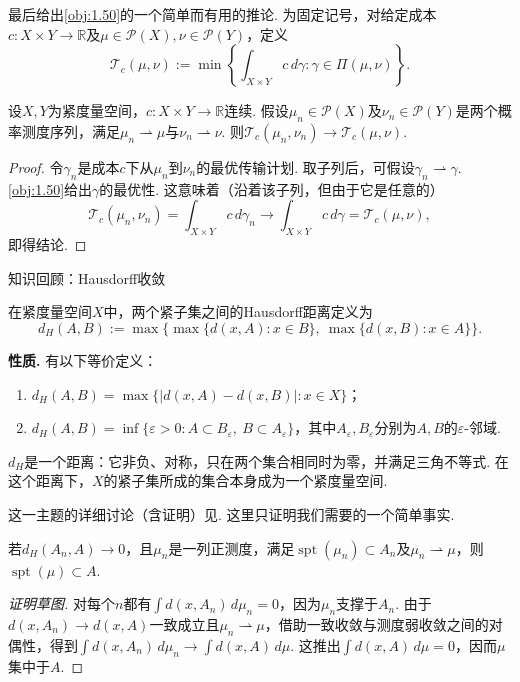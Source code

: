 最后给出\autoref{obj:1.50}的一个简单而有用的推论. 为固定记号，对给定成本$c:X\times Y\to\mathbb R$及$\mu\in\mathscr P(X),\nu\in\mathscr P(Y)$，定义
\[
\mathscr T_c(\mu,\nu):=\min\left\{\int_{X\times Y}c\,d\gamma:\gamma\in\Pi(\mu,\nu)\right\}.
\]

\begin{theorem}\label{obj:1.51}
设$X,Y$为紧度量空间，$c:X\times Y\to\mathbb R$连续. 假设$\mu_n\in\mathscr P(X)$及$\nu_n\in\mathscr P(Y)$是两个概率测度序列，满足$\mu_n\rightharpoonup\mu$与$\nu_n\rightharpoonup\nu$. 则$\mathscr T_c(\mu_n,\nu_n)\to\mathscr T_c(\mu,\nu)$.
\end{theorem}
\begin{proof}
令$\gamma_n$是成本$c$下从$\mu_n$到$\nu_n$的最优传输计划. 取子列后，可假设$\gamma_n\rightharpoonup\gamma$. \autoref{obj:1.50}给出$\gamma$的最优性. 这意味着（沿着该子列，但由于它是任意的）
\[
\mathscr T_c(\mu_n,\nu_n)=\int_{X\times Y}c\,d\gamma_n
\longrightarrow\int_{X\times Y}c\,d\gamma=\mathscr T_c(\mu,\nu),
\]
即得结论.
\end{proof}

\begin{sourcebox}{知识回顾：Hausdorff收敛}\label{box:1.13}
\begin{definition*}
在紧度量空间$X$中，两个紧子集之间的Hausdorff距离定义为
\[
d_H(A,B):=\max\{\max\{d(x,A):x\in B\},\ \max\{d(x,B):x\in A\}\}.
\]
\end{definition*}
\textbf{性质.} 有以下等价定义：
\begin{enumerate}
\item $d_H(A,B)=\max\{|d(x,A)-d(x,B)|:x\in X\}$；
\item $d_H(A,B)=\inf\{\varepsilon>0:A\subset B_\varepsilon,\ B\subset A_\varepsilon\}$，其中$A_\varepsilon,B_\varepsilon$分别为$A,B$的$\varepsilon$-邻域.
\end{enumerate}
\begin{theorem*}[Blaschke]
$d_H$是一个距离：它非负、对称，只在两个集合相同时为零，并满足三角不等式. 在这个距离下，$X$的紧子集所成的集合本身成为一个紧度量空间.
\end{theorem*}
这一主题的详细讨论（含证明）见\cite{b12}. 这里只证明我们需要的一个简单事实.

\begin{proposition*}
若$d_H(A_n,A)\to0$，且$\mu_n$是一列正测度，满足$\operatorname{spt}(\mu_n)\subset A_n$及$\mu_n\rightharpoonup\mu$，则$\operatorname{spt}(\mu)\subset A$.
\end{proposition*}
\begin{proof}[证明草图]
对每个$n$都有$\int d(x,A_n)\,d\mu_n=0$，因为$\mu_n$支撑于$A_n$. 由于$d(x,A_n)\to d(x,A)$一致成立且$\mu_n\rightharpoonup\mu$，借助一致收敛与测度弱收敛之间的对偶性，得到$\int d(x,A_n)\,d\mu_n\to\int d(x,A)\,d\mu$. 这推出$\int d(x,A)\,d\mu=0$，因而$\mu$集中于$A$.
\end{proof}
\end{sourcebox}

